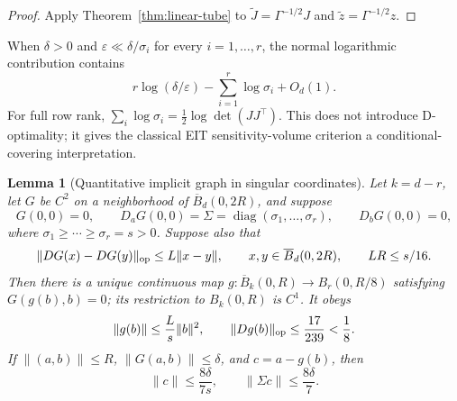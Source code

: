 \documentclass[11pt]{article}
\newtheorem{lemma}[theorem]{Lemma}
\theoremstyle{definition}
\begin{document}
\begin{proof}
Apply Theorem~\ref{thm:linear-tube} to
$\widetilde J=\Gamma^{-1/2}J$ and $\widetilde z=\Gamma^{-1/2}z$.
\end{proof}

When $\delta>0$ and
$\varepsilon\ll\delta/\sigma_i$ for every $i=1,\ldots,r$, the normal
logarithmic contribution contains
\[
 r\log(\delta/\varepsilon)-\sum_{i=1}^r\log\sigma_i+O_d(1).
\]
For full row rank, $\sum_i\log\sigma_i=\tfrac12\log\det(JJ^\top)$.  This does
not introduce D-optimality; it gives the classical EIT sensitivity-volume
criterion \citep{onsager2024sensitivity} a conditional-covering interpretation.

\begin{lemma}[Quantitative implicit graph in singular coordinates]
\label{lem:quantitative-graph}
Let $k=d-r$, let $G$ be $C^2$ on a neighborhood of
$\overline B_d(0,2R)$, and suppose
\[
 G(0,0)=0,\qquad D_aG(0,0)=\Sigma
 =\operatorname{diag}(\sigma_1,\ldots,\sigma_r),
 \qquad D_bG(0,0)=0,
\]
where $\sigma_1\ge\cdots\ge\sigma_r=s>0$.  Suppose also that
\[
 \|DG(x)-DG(y)\|_{\rm op}\le L\|x-y\|,
 \qquad x,y\in\overline B_d(0,2R),
 \qquad LR\le s/16.
\]
Then there is a unique continuous map
$g:\overline B_k(0,R)\to B_r(0,R/8)$ satisfying $G(g(b),b)=0$; its restriction
to $B_k(0,R)$ is $C^1$.  It obeys
\begin{equation}\label{eq:graph-bounds}
 \|g(b)\|\le\frac{L}{s}\|b\|^2,
 \qquad \|Dg(b)\|_{\rm op}\le\frac{17}{239}<\frac18.
\end{equation}
If $\|(a,b)\|\le R$, $\|G(a,b)\|\le\delta$, and $c=a-g(b)$, then
\begin{equation}\label{eq:graph-ellipsoid}
 \|c\|\le\frac{8\delta}{7s},
 \qquad \|\Sigma c\|\le\frac{8\delta}{7}.
\end{equation}
\end{lemma}
\end{document}
